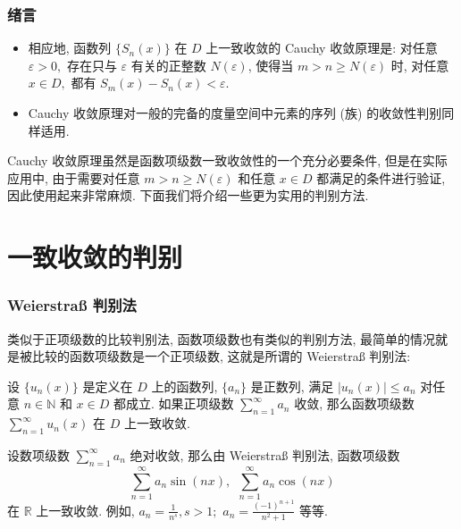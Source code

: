 
\begin{frame}
\frametitle{绪言}

\begin{remark}
\begin{itemize}
\item 相应地, 函数列 $\{S_n(x)\}$ 在 $D$ 上一致收敛的 Cauchy 收敛原理是: 对任意 $\varepsilon > 0,$ 存在只与 $\varepsilon$ 有关的正整数 $N(\varepsilon)$, 使得当 $m > n \geqslant N(\varepsilon)$ 时, 对任意 $x \in D,$ 都有 $S_m(x) - S_n(x) < \varepsilon.$
\item Cauchy 收敛原理对一般的完备的度量空间中元素的序列 (族) 的收敛性判别同样适用.
\end{itemize}
\end{remark}

\pause
\vspace{1em}

Cauchy 收敛原理虽然是函数项级数一致收敛性的一个充分必要条件, 但是在实际应用中, 由于需要对任意 $m > n \geqslant N(\varepsilon)$ 和任意 $x \in D$ 都满足的条件进行验证, 因此使用起来非常麻烦. 下面我们将介绍一些更为实用的判别方法.

\end{frame}


\section{一致收敛的判别}


\begin{frame}
\frametitle{Weierstraß 判别法}

类似于正项级数的比较判别法, 函数项级数也有类似的判别方法, 最简单的情况就是被比较的函数项级数是一个正项级数, 这就是所谓的 Weierstraß 判别法:

\begin{thm}
设 $\{u_n(x)\}$ 是定义在 $D$ 上的函数列, $\{a_n\}$ 是正数列, 满足 $|u_n(x)| \leqslant a_n$ 对任意 $n \in \mathbb{N}$ 和 $x \in D$ 都成立. 如果正项级数 $\displaystyle \sum_{n=1}^\infty a_n$ 收敛, 那么函数项级数 $\displaystyle \sum_{n=1}^\infty u_n(x)$ 在 $D$ 上一致收敛.
\end{thm}

\pause
\vspace{0.5em}

\begin{eg}
设数项级数 $\sum_{n=1}^\infty a_n$ 绝对收敛, 那么由 Weierstraß 判别法, 函数项级数
\[
\sum_{n=1}^\infty a_n \sin (n x), ~~ \sum_{n=1}^\infty a_n \cos (n x)
\]
在 $\mathbb{R}$ 上一致收敛.
\pause
例如, $a_n = \frac{1}{n^s}, s > 1;$ $a_n = \frac{(-1)^{n+1}}{n^2 + 1}$ 等等.
\end{eg}

\end{frame}

